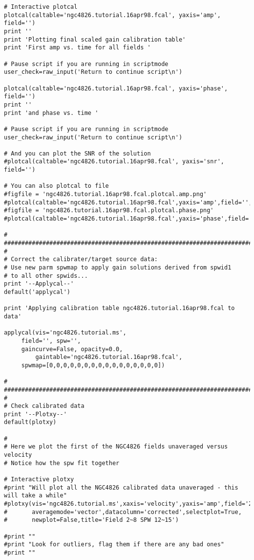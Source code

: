 \begin{verbatim}
# Interactive plotcal
plotcal(caltable='ngc4826.tutorial.16apr98.fcal', yaxis='amp', field='')
print ''
print 'Plotting final scaled gain calibration table'
print 'First amp vs. time for all fields '
	
# Pause script if you are running in scriptmode
user_check=raw_input('Return to continue script\n')

plotcal(caltable='ngc4826.tutorial.16apr98.fcal', yaxis='phase', field='')
print ''
print 'and phase vs. time '

# Pause script if you are running in scriptmode
user_check=raw_input('Return to continue script\n')

# And you can plot the SNR of the solution
#plotcal(caltable='ngc4826.tutorial.16apr98.fcal', yaxis='snr', field='')

# You can also plotcal to file
#figfile = 'ngc4826.tutorial.16apr98.fcal.plotcal.amp.png'
#plotcal(caltable='ngc4826.tutorial.16apr98.fcal',yaxis='amp',field='',showgui=False,figfile=figfile)
#figfile = 'ngc4826.tutorial.16apr98.fcal.plotcal.phase.png'
#plotcal(caltable='ngc4826.tutorial.16apr98.fcal',yaxis='phase',field='',showgui=False,figfile=figfile)

#
##########################################################################
#
# Correct the calibrater/target source data:
# Use new parm spwmap to apply gain solutions derived from spwid1
# to all other spwids... 
print '--Applycal--'
default('applycal')

print 'Applying calibration table ngc4826.tutorial.16apr98.fcal to data'

applycal(vis='ngc4826.tutorial.ms',
	 field='', spw='',
	 gaincurve=False, opacity=0.0, 
         gaintable='ngc4826.tutorial.16apr98.fcal',
	 spwmap=[0,0,0,0,0,0,0,0,0,0,0,0,0,0,0,0])

#
##########################################################################
#
# Check calibrated data
print '--Plotxy--'
default(plotxy)

#
# Here we plot the first of the NGC4826 fields unaveraged versus velocity
# Notice how the spw fit together

# Interactive plotxy
#print "Will plot all the NGC4826 calibrated data unaveraged - this will take a while"
#plotxy(vis='ngc4826.tutorial.ms',xaxis='velocity',yaxis='amp',field='2~8',spw='12~15',
#       averagemode='vector',datacolumn='corrected',selectplot=True,
#       newplot=False,title='Field 2~8 SPW 12~15')

#print ""
#print "Look for outliers, flag them if there are any bad ones"
#print ""
	

\end{verbatim}
